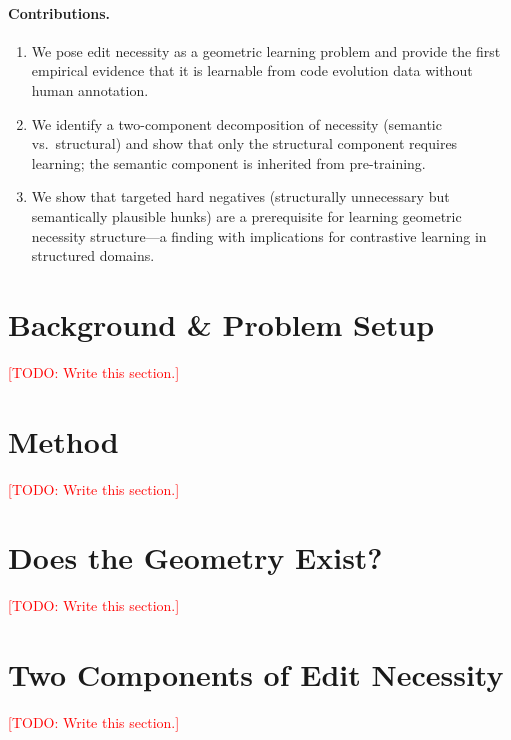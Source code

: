 \documentclass{article}
\newcommand{\todo}[1]{\textcolor{red}{[TODO: #1]}}
\begin{document}
\paragraph{Contributions.}
\begin{enumerate}[itemsep=2pt,topsep=2pt]
  \item We pose edit necessity as a geometric learning problem and provide the
    first empirical evidence that it is learnable from code evolution data
    without human annotation.
  \item We identify a two-component decomposition of necessity (semantic vs.\
    structural) and show that only the structural component requires learning;
    the semantic component is inherited from pre-training.
  \item We show that targeted hard negatives (structurally unnecessary but
    semantically plausible hunks) are a prerequisite for learning geometric
    necessity structure---a finding with implications for contrastive
    learning in structured domains.
\end{enumerate}

\section{Background \& Problem Setup}
\label{sec:setup}
\todo{Write this section.}

\section{Method}
\label{sec:method}
\todo{Write this section.}

\section{Does the Geometry Exist?}
\label{sec:geometry}
\todo{Write this section.}

\section{Two Components of Edit Necessity}
\label{sec:two-components}
\todo{Write this section.}

\end{document}

